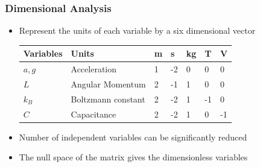 \documentclass[c,compress]{beamer}
\begin{document}
\begin{frame}\frametitle{Dimensional Analysis} \label{DA}

\begin{itemize}
    \item Represent the units of each variable by a six dimensional vector

\begin{table}[]
\centering
\begin{tabular}{@{}lllllll@{}}
\toprule
 Variables & Units & m & s & kg & T & V \\ \midrule
$a,g$ & Acceleration & 1 & -2 & 0 & 0 & 0 \\
$L$  & Angular Momentum & 2 & -1 & 1 & 0 & 0 \\
$k_B$  & Boltzmann constant & 2 & -2 & 1 & -1 & 0 \\
$C$  & Capacitance & 2 & -2 & 1 & 0 & -1 \\ \bottomrule
\end{tabular}
\end{table}
    \item Number of independent variables can be significantly reduced
    \item The null space of the matrix gives the dimensionless variables
\end{itemize}
\end{frame}
\end{document}
